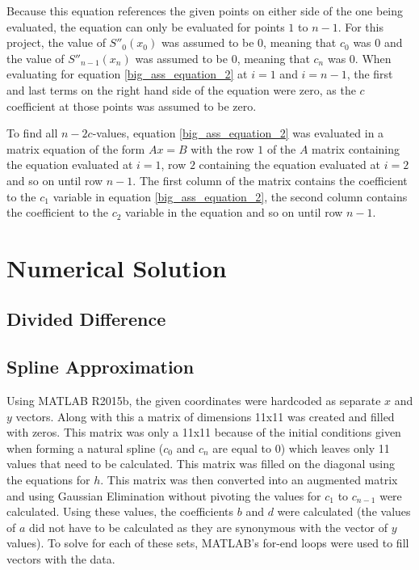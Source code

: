 \documentclass[12pt, letterpaper]{article} %
\begin{document}
Because this equation references the given points on either side of the one being evaluated, the equation can only be evaluated for points $1$ to $n-1$. For this project, the value of $S''_0(x_0)$ was assumed to be $0$, meaning that $c_0$ was $0$ and the value of $S''_{n-1}(x_n)$ was assumed to be $0$, meaning that $c_n$ was $0$. When evaluating for equation \ref{big_ass_equation_2} at $i = 1$ and $i = n-1$, the first and last terms on the right hand side of the equation were zero, as the $c$ coefficient at those points was assumed to be zero.

To find all $n-2 c$-values, equation \ref{big_ass_equation_2} was evaluated in a matrix equation of the form $Ax = B$ with the row $1$ of the $A$ matrix containing the equation evaluated at $i = 1$, row $2$ containing the equation evaluated at $i = 2$ and so on until row $n-1$. The first column of the matrix contains the coefficient to the $c_1$ variable in equation \ref{big_ass_equation_2}, the second column contains the coefficient to the $c_2$ variable in the equation and so on until row $n-1$.

\section{Numerical Solution}
\subsection{Divided Difference}
\subsection{Spline Approximation}
Using MATLAB R2015b, the given coordinates were hardcoded as separate $x$ and $y$ vectors. Along with this a matrix of dimensions 11x11 was created and filled with zeros. This matrix was only a 11x11 because of the initial conditions given when forming a natural spline ($c_0$ and $c_n$ are equal to 0) which leaves only 11 values that need to be calculated. This matrix was filled on the diagonal using the equations for $h$. This matrix was then converted into an augmented matrix and using Gaussian Elimination without pivoting the values for $c_1$ to $c_{n-1}$ were calculated. Using these values, the coefficients $b$ and $d$ were calculated (the values of $a$ did not have to be calculated as they are synonymous with the vector of $y$ values). To solve for each of these sets, MATLAB's for-end loops were used to fill vectors with the data. 
\end{document}
